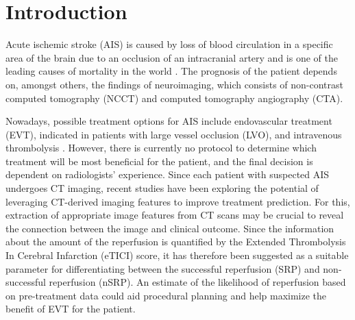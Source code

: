 \documentclass[preprint,12pt]{elsarticle}
\begin{document}


\section{Introduction}
\label{sec1}

Acute ischemic stroke (AIS) is caused by loss of blood circulation in a specific area of the brain due to an occlusion of an intracranial artery and is one of the leading causes of mortality in the world \cite{Phipps2020}. The prognosis of the patient depends on, amongst others, the findings of neuroimaging, which consists of non-contrast computed tomography (NCCT) and computed tomography angiography (CTA).

Nowadays, possible treatment options for AIS include endovascular treatment (EVT), indicated in patients with large vessel occlusion (LVO), and intravenous thrombolysis \cite{Powers2020}. However, there is currently no protocol to determine which treatment will be most beneficial for the patient, and the final decision is dependent on radiologists' experience. Since each patient with suspected AIS undergoes CT imaging, recent studies have been exploring the potential of leveraging CT-derived imaging features to improve treatment prediction. For this, extraction of appropriate image features from CT scans may be crucial to reveal the connection between the image and clinical outcome. Since the information about the amount of the reperfusion is quantified by the Extended Thrombolysis In Cerebral Infarction (eTICI) score, it has therefore been suggested as a suitable parameter for differentiating between the successful reperfusion (SRP) and non-successful reperfusion (nSRP). An estimate of the likelihood of reperfusion based on pre-treatment data could aid procedural planning and help maximize the benefit of EVT for the patient.

\end{document}
